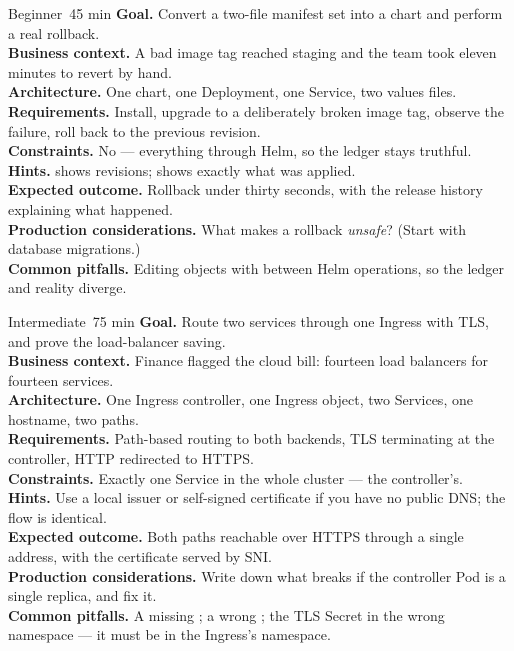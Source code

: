 
\begin{minilab}{Beginner}{~45 min}
\textbf{Goal.} Convert a two-file manifest set into a chart and perform a real rollback.\\
\textbf{Business context.} A bad image tag reached staging and the team took eleven minutes to revert by hand.\\
\textbf{Architecture.} One chart, one Deployment, one Service, two values files.\\
\textbf{Requirements.} Install, upgrade to a deliberately broken image tag, observe the failure, roll back to the previous revision.\\
\textbf{Constraints.} No  --- everything through Helm, so the ledger stays truthful.\\
\textbf{Hints.}  shows revisions;  shows exactly what was applied.\\
\textbf{Expected outcome.} Rollback under thirty seconds, with the release history explaining what happened.\\
\textbf{Production considerations.} What makes a rollback \emph{unsafe}? (Start with database migrations.)\\
\textbf{Common pitfalls.} Editing objects with  between Helm operations, so the ledger and reality diverge.
\end{minilab}

\begin{minilab}{Intermediate}{~75 min}
\textbf{Goal.} Route two services through one Ingress with TLS, and prove the load-balancer saving.\\
\textbf{Business context.} Finance flagged the cloud bill: fourteen load balancers for fourteen services.\\
\textbf{Architecture.} One Ingress controller, one Ingress object, two Services, one hostname, two paths.\\
\textbf{Requirements.} Path-based routing to both backends, TLS terminating at the controller, HTTP redirected to HTTPS.\\
\textbf{Constraints.} Exactly one  Service in the whole cluster --- the controller's.\\
\textbf{Hints.} Use a local issuer or self-signed certificate if you have no public DNS; the flow is identical.\\
\textbf{Expected outcome.} Both paths reachable over HTTPS through a single address, with the certificate served by SNI.\\
\textbf{Production considerations.} Write down what breaks if the controller Pod is a single replica, and fix it.\\
\textbf{Common pitfalls.} A missing ; a wrong ; the TLS Secret in the wrong namespace --- it must be in the Ingress's namespace.
\end{minilab}

